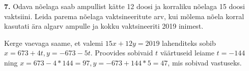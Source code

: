 \documentclass[a4paper, 10pt]{article}
\begin{document}
\noindent \textbf{7.} Odava nõelaga saab ampullist kätte 12 doosi ja korraliku nõelaga 15 doosi vaktsiini. Leida parema nõelaga vaktsineeritute arv, kui mõlema nõela korral kasutati ära algarv ampulle ja kokku vaktsineeriti 2019 inimest.

\bigskip
Kerge vaevaga saame, et valemi $15x+12y=2019$ lahenditeks sobib $x=673+4t, y=-673-5t$. Proovides sobivaid $t$ väärtuseid leiame $t=-144$ ning $x=673-4*144=97,y=-673+144*5=47$, mis sobivad vastuseks.
\end{document}
